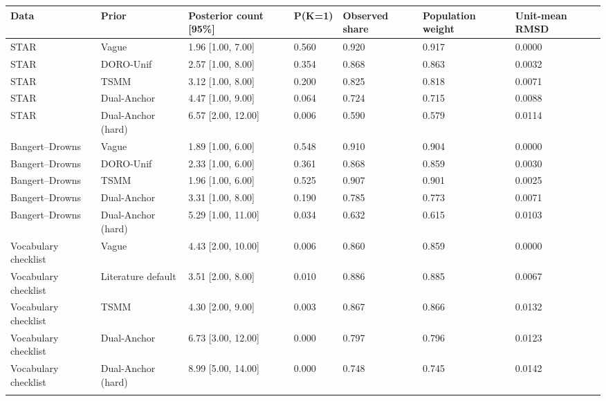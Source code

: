 \begin{longtable}{lllllll}
\toprule
Data & Prior & Posterior count [95\%] & P(K=1) & Observed share & Population weight & Unit-mean RMSD \\
\midrule\endhead
STAR & Vague & 1.96 [1.00, 7.00] & 0.560 & 0.920 & 0.917 & 0.0000 \\ \addlinespace[3pt]
STAR & DORO-Unif & 2.57 [1.00, 8.00] & 0.354 & 0.868 & 0.863 & 0.0032 \\ \addlinespace[3pt]
STAR & TSMM & 3.12 [1.00, 8.00] & 0.200 & 0.825 & 0.818 & 0.0071 \\ \addlinespace[3pt]
STAR & Dual-Anchor & 4.47 [1.00, 9.00] & 0.064 & 0.724 & 0.715 & 0.0088 \\ \addlinespace[3pt]
STAR & Dual-Anchor (hard) & 6.57 [2.00, 12.00] & 0.006 & 0.590 & 0.579 & 0.0114 \\ \addlinespace[3pt]
Bangert--Drowns & Vague & 1.89 [1.00, 6.00] & 0.548 & 0.910 & 0.904 & 0.0000 \\ \addlinespace[3pt]
Bangert--Drowns & DORO-Unif & 2.33 [1.00, 6.00] & 0.361 & 0.868 & 0.859 & 0.0030 \\ \addlinespace[3pt]
Bangert--Drowns & TSMM & 1.96 [1.00, 6.00] & 0.525 & 0.907 & 0.901 & 0.0025 \\ \addlinespace[3pt]
Bangert--Drowns & Dual-Anchor & 3.31 [1.00, 8.00] & 0.190 & 0.785 & 0.773 & 0.0071 \\ \addlinespace[3pt]
Bangert--Drowns & Dual-Anchor (hard) & 5.29 [1.00, 11.00] & 0.034 & 0.632 & 0.615 & 0.0103 \\ \addlinespace[3pt]
Vocabulary checklist & Vague & 4.43 [2.00, 10.00] & 0.006 & 0.860 & 0.859 & 0.0000 \\ \addlinespace[3pt]
Vocabulary checklist & Literature default & 3.51 [2.00, 8.00] & 0.010 & 0.886 & 0.885 & 0.0067 \\ \addlinespace[3pt]
Vocabulary checklist & TSMM & 4.30 [2.00, 9.00] & 0.003 & 0.867 & 0.866 & 0.0132 \\ \addlinespace[3pt]
Vocabulary checklist & Dual-Anchor & 6.73 [3.00, 12.00] & 0.000 & 0.797 & 0.796 & 0.0123 \\ \addlinespace[3pt]
Vocabulary checklist & Dual-Anchor (hard) & 8.99 [5.00, 14.00] & 0.000 & 0.748 & 0.745 & 0.0142 \\ \addlinespace[3pt]
\bottomrule\end{longtable}
